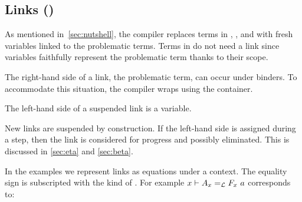 \subsection{Links (\linkStore)}

\noindent
As mentioned in~\cref{sec:nutshell}, the compiler
replaces terms in \maybeeta, \maybebeta, and \notllambda with fresh
variables linked to the problematic terms. Terms in \maybebeta do not
need a link since \Ho{} variables faithfully represent
the problematic term thanks to their scope.



\noindent
The right-hand side of a link, the problematic term, can occur under binders.
To accommodate this situation, the compiler wraps  using
the  container. %

\begin{invariant}\label{inv:linklhs}
  The left-hand side of a suspended link
  is a variable.
\end{invariant}

\noindent
New links are suspended by construction.
If the left-hand side is assigned during a step, then 
the link is considered for progress and possibly eliminated.
This is discussed in \cref{sec:eta} and \cref{sec:beta}.

In the examples we represent links as equations
under a context.
The equality sign is subscripted with the
kind of . For example $x \vdash A_x =_{\mathcal{L}} F_x~a$ corresponds to:
\begin{center}
\end{center}


